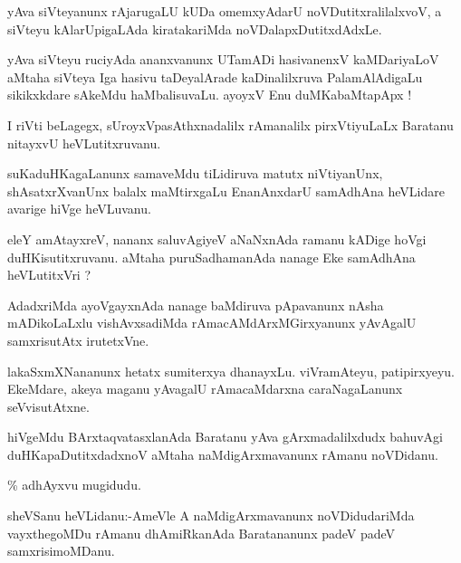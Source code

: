 \documentclass{article}
\begin{document}
\begin{mn}%
yAva siVteyanunx rAjarugaLU  kUDa omemxyAdarU noVDutitxralilalxvoV, a siVteyu 
kAlarUpigaLAda kiratakariMda noVDalapxDutitxdAdxLe.
\end{mn}

\begin{mn}%
yAva siVteyu ruciyAda ananxvanunx UTamADi hasivanenxV kaMDariyaLoV aMtaha 
siVteya Iga hasivu taDeyalArade kaDinalilxruva PalamAlAdigaLu sikikxkdare sAkeMdu 
haMbalisuvaLu. ayoyxV Enu duMKabaMtapApx !
\end{mn}

\begin{mn}%
I riVti beLagegx, sUroyxVpasAthxnadalilx rAmanalilx pirxVtiyuLaLx Baratanu 
nitayxvU heVLutitxruvanu.
\end{mn}

\begin{mn}%
suKaduHKagaLanunx samaveMdu tiLidiruva matutx niVtiyanUnx, shAsatxrXvanUnx balalx 
maMtirxgaLu EnanAnxdarU samAdhAna heVLidare avarige hiVge heVLuvanu.
\end{mn}

\begin{mn}%
eleY amAtayxreV, nananx saluvAgiyeV aNaNxnAda ramanu kADige hoVgi 
duHKisutitxruvanu. aMtaha puruSadhamanAda nanage Eke samAdhAna heVLutitxVri ?
\end{mn}

\begin{mn}%
AdadxriMda ayoVgayxnAda nanage baMdiruva pApavanunx nAsha mADikoLaLxlu 
vishAvxsadiMda rAmacAMdArxMGirxyanunx yAvAgalU samxrisutAtx irutetxVne.
\end{mn}

\begin{mn}%
lakaSxmXNananunx hetatx sumiterxya dhanayxLu. viVramAteyu, patipirxyeyu. EkeMdare, 
akeya maganu yAvagalU rAmacaMdarxna caraNagaLanunx seVvisutAtxne.
\end{mn}

\begin{mn}%
hiVgeMdu BArxtaqvatasxlanAda Baratanu yAva gArxmadalilxdudx bahuvAgi 
duHKapaDutitxdadxnoV aMtaha naMdigArxmavanunx rAmanu noVDidanu.
\end{mn}

\%%
adhAyxvu mugidudu.

\begin{mn}%
sheVSanu heVLidanu:-AmeVle A naMdigArxmavanunx noVDidudariMda vayxthegoMDu rAmanu 
dhAmiRkanAda Baratananunx padeV padeV samxrisimoMDanu. 
\end{mn}
\end{document}
